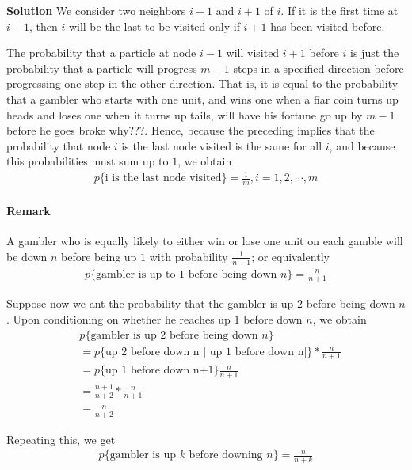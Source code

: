 \documentclass[10 pt,final]{article}
\newcommand{\impo}[1]{{\color{magenta} #1}}
\newcommand{\question}[1]{{\color{blue} #1}}
\begin{document}
\textbf{Solution} We consider two neighbors $i-1$ and $i+1$ of $i$. If it is the first time at $i-1$, then $i$ will be the last to be visited only if $i+1$ has been visited before. 

The probability that a particle at node $i-1$ will visited $i+1$ before $i$ is just the probability that a particle will progress \impo{$m-1$} steps in a specified direction before progressing one step in the other direction. That is,  it is equal to the probability that a gambler who starts with one unit, and wins one when a fiar coin turns up heads and loses one when it turns up tails, will \impo{have his fortune go up by $m-1$ before he goes broke
} \question{why???}. Hence, because \impo{the preceding implies that the probability that node $i$ is the last node visited is the same for all $i$}, and because this probabilities must sum up to $1$, we obtain
\begin{align*}
p\{\mbox{i is the last node visited}\} = \frac{1}{m}, i = 1, 2, \cdots, m
\end{align*}


\paragraph{Remark} A gambler who is equally likely to either win or lose one unit on each gamble will be down $n$ before being up $1$ with probability $\frac{1}{n+1}$; or equivalently
\begin{align*}
p\{\mbox{gambler is up to 1 before being down $n$}\} = \frac{n}{n+1}
\end{align*}

Suppose now we ant the probability that the gambler is up $2$ before being down $n$. Upon conditioning on whether he reaches up $1$ before down $n$, we obtain
\begin{align*}
& p\{\mbox{gambler is up $2$ before being down $n$}\}  \\
& = p\{\mbox{up 2 before down n | up 1 before down n|}\}*\frac{n}{n+1} \\
& = p\{\mbox{up 1 before down n+1}\} \frac{n}{n+1} \\
& = \frac{n+1}{n+2} * \frac{n}{n+1} \\
& = \frac{n}{n+2}
\end{align*}

Repeating this, we get 
\begin{align*}
p\{ \mbox{gambler is up $k$ before downing $n$}\} = \frac{n}{n+k}
\end{align*}
\end{document}
